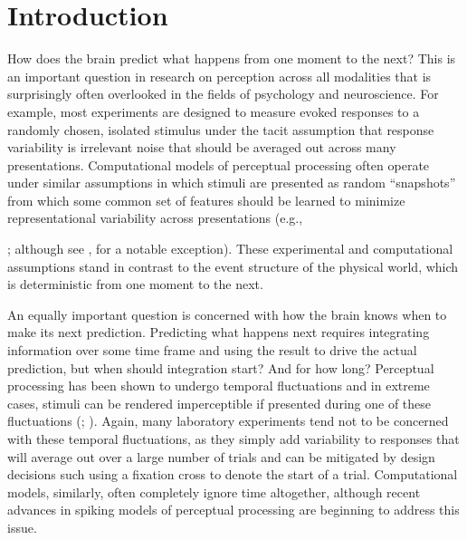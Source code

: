 \documentclass[../dwyatte_dissertation.tex]{subfiles}
\begin{document}


\section{Introduction}
How does the brain predict what happens from one moment to the next? This is an important question in research on perception across all modalities that is surprisingly often overlooked in the fields of psychology and neuroscience. For example, most experiments are designed to measure evoked responses to a randomly chosen, isolated stimulus under the tacit assumption that response variability is irrelevant noise that should be averaged out across many presentations. Computational models of perceptual processing often operate under similar assumptions in which stimuli are presented as random ``snapshots'' from which some common set of features should be learned to minimize representational variability across presentations (e.g., {; although see , for a notable exception). These experimental and computational assumptions stand in contrast to the event structure of the physical world, which is deterministic from one moment to the next. 

An equally important question is concerned with how the brain knows when to make its next prediction. Predicting what happens next requires integrating information over some time frame and using the result to drive the actual prediction, but when should integration start? And for how long? Perceptual processing has been shown to undergo temporal fluctuations and in extreme cases, stimuli can be rendered imperceptible if presented during one of these fluctuations (; ). Again, many laboratory experiments tend not to be concerned with these temporal fluctuations, as they simply add variability to responses that will average out over a large number of trials and can be mitigated by design decisions such using a fixation cross to denote the start of a trial. Computational models, similarly, often completely ignore time altogether, although recent advances in spiking models of perceptual processing \cite[e.g.,]{MasquelierThorpe07} are beginning to address this issue.

}
\end{document}
